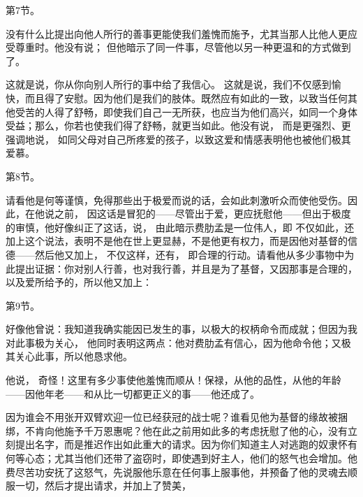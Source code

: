 第7节。 \par

没有什么比提出向他人所行的善事更能使我们羞愧而施予，尤其当那人比他人更应受尊重时。他没有说； 但他暗示了同一件事，尽管他以另一种更温和的方式做到了。\par

 这就是说，你从你向别人所行的事中给了我信心。 这就是说，我们不仅感到愉快，而且得了安慰。因为他们是我们的肢体。既然应有如此的一致，以致当任何其他受苦的人得了舒畅，即使我们自己一无所获，也应当为他们高兴，如同一个身体受益；那么，你若也使我们得了舒畅，就更当如此。他没有说， 而是更强烈、更强调地说， 如同父母对自己所疼爱的孩子，以致这爱和情感表明他也被他们极其爱慕。\par

第8节。 \par

请看他是何等谨慎，免得那些出于极爱而说的话，会如此刺激听众而使他受伤。因此，在他说之前， 因这话是冒犯的——尽管出于爱，更应抚慰他——但出于极度的审慎，他好像纠正了这话，说， 由此暗示费肋孟是一位伟人，即 不仅如此，还加上这个说法，表明不是他在世上更显赫，不是他更有权力，而是因他对基督的信德——然后他又加上， 不仅这样，还有， 即合理的行动。请看他从多少事物中为此提出证据：你对别人行善，也对我行善，并且是为了基督，又因那事是合理的，以及爱所给予的，所以他又加上：\par

第9节。 \par

好像他曾说：我知道我确实能因已发生的事，以极大的权柄命令而成就；但因为我对此事极为关心， 他同时表明这两点：他对费肋孟有信心，因为他命令他；又极其关心此事，所以他恳求他。\par

 他说， 奇怪！这里有多少事使他羞愧而顺从！保禄，从他的品性，从他的年龄——因他年老——和从比一切都更正义的事——他还成了。\par

因为谁会不用张开双臂欢迎一位已经获冠的战士呢？谁看见他为基督的缘故被捆绑，不肯向他施予千万恩惠呢？他在此之前用如此多的考虑抚慰了他的心，没有立刻提出名字，而是推迟作出如此重大的请求。因为你们知道主人对逃跑的奴隶怀有何等心态；尤其当他们还带了盗窃时，即使遇到好主人，他们的怒气也会增加。他费尽苦功安抚了这怒气，先说服他乐意在任何事上服事他，并预备了他的灵魂去顺服一切，然后才提出请求，并加上了赞美， \par

